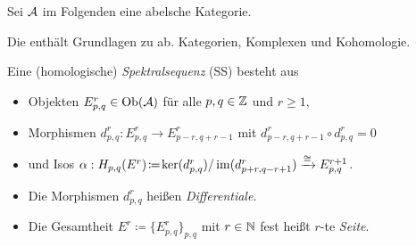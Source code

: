 \documentclass{cheat-sheet}
\begin{document}

Sei $\mathcal{A}$ im Folgenden eine abelsche Kategorie.

\begin{bem}
  Die  enthält Grundlagen zu ab. Kategorien, Komplexen und Kohomologie.
\end{bem}

\begin{defn}
  Eine (homologische) \emph{Spektralsequenz} (SS) besteht aus
  \begin{itemize}
    \item Objekten $E^r_{p,q} \in \operatorname{Ob}(\mathcal{A})$ für alle $p, q \in \mathbb{Z}$ und $r \geq 1$,
    \item Morphismen $d^r_{p,q} : E^r_{p,q} \to E^r_{p-r,q+r-1}$ mit $d^r_{p-r,q+r-1} \circ d^r_{p,q} = 0$
    \item und Isos $\alpha : H_{p,q}(E^r) \!\coloneqq\! \ker(d^r_{p,q}) / \operatorname{im}(d^r_{p+r,q-r+1}) \xrightarrow{\cong} E^{r+1}_{p,q}$.
  \end{itemize}
\end{defn}

\begin{sprech}
  \begin{itemize}
    \item Die Morphismen $d^r_{p,q}$ heißen \emph{Differentiale}.
    \item Die Gesamtheit $E^r \coloneqq \{ E^r_{p,q} \}_{p,q}$ mit $r \in \mathbb{N}$ fest heißt $r$-te \emph{Seite}.
  \end{itemize}
\end{sprech}
\end{document}
